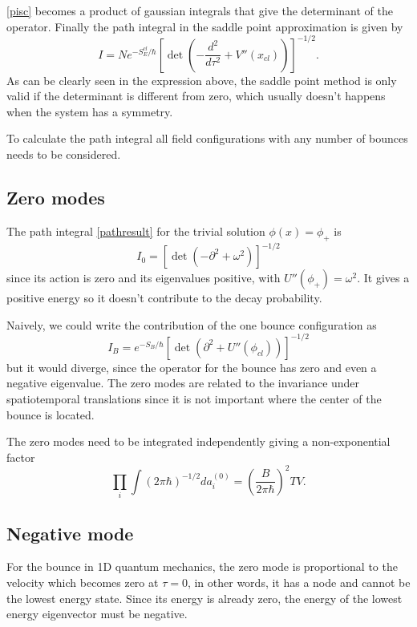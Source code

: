 \documentclass[a0,portrait]{a0poster}
\begin{document}
\begin{multicols}{3}
\cref{pisc} becomes a product of gaussian integrals that give the determinant of the operator. Finally the path integral in the saddle point approximation is given by
\begin{equation}\label{pathresult}
I = Ne^{-S_E^{cl} / \hbar} \left[ \det\left(-\frac{d^2}{d\tau^2} + V''(x_{cl}) \right)\right]^{-1/2}.
\end{equation}
As can be clearly seen in the expression above, the saddle point method is only valid if the determinant is different from zero, which usually doesn't happens when the system has a symmetry. 

To calculate the path integral all field configurations with any number of bounces needs to be considered.

\subsection{Zero modes} 

The path integral \cref{pathresult} for the trivial solution $\phi(x) = \phi_+$ is 
\begin{equation}
I_0 = \left[ \det\left(-\partial^2 + \omega^2 \right)\right]^{-1/2}
\end{equation}
since its action is zero and its eigenvalues positive, with $U''(\phi_+)=\omega^2$. It gives a positive energy so it doesn't contribute to the decay probability. 

Naively, we could write the contribution of the one bounce configuration as
\begin{equation}\label{ib}
I_B = e^{-S_B /  \hbar} \left[ \det\left(\partial^2 + U''(\phi_{cl}) \right)\right]^{-1/2}
\end{equation}
but it would diverge, since the operator for the bounce has zero and even a negative eigenvalue. The zero modes are related to the invariance under spatiotemporal translations since it is not important where the center of the bounce is located. 

The zero modes need to be integrated independently giving a non-exponential factor
\begin{equation}
\prod_i \int (2\pi \hbar)^{-1/2} da_i^{(0)} = \left(\frac{B}{2\pi\hbar}\right)^2 TV.
\end{equation}

\subsection{Negative mode}

For the bounce in 1D quantum mechanics,  the zero mode is proportional to the velocity which becomes zero at $\tau = 0$, in other words, it has a node and cannot be the lowest energy state. Since its energy is already zero, the energy of the lowest energy eigenvector must be negative. 


\end{multicols}
\end{document}
